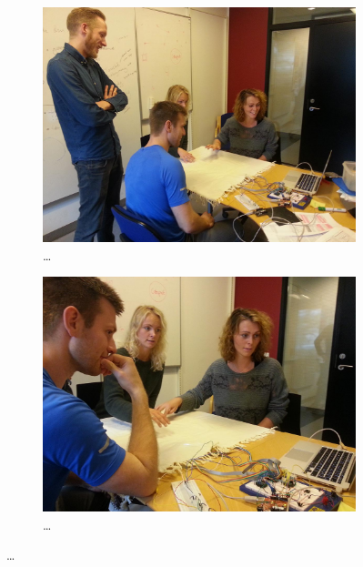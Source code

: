 \begin{figure}
        \centering
        \begin{subfigure}[b]{0.44\textwidth}
                \centering
                \includegraphics[width=\textwidth]{figures/touch/evaluation/kaia-gitte-troels/alle}
                \caption{\dots}
                \label{fig:textiletouch:eval:kaia-gitte-troels:alle}
        \end{subfigure}%
        \hspace{0.02\textwidth}
        \begin{subfigure}[b]{0.44\textwidth}
                \centering
                \includegraphics[width=\textwidth]{figures/touch/evaluation/kaia-gitte-troels/kaia-gitte2}
                \caption{\dots}
                \label{fig:textiletouch:eval:kaia-gitte-troels:kaia-gitte2}
        \end{subfigure}


\end{figure}
